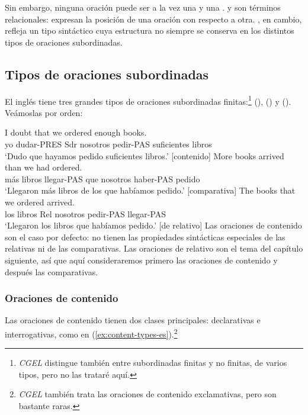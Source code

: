 Sin embargo, ninguna oración puede ser a la vez una  y una .  y  son términos relacionales: expresan la posición de una oración con respecto a otra. , en cambio, refleja un tipo sintáctico cuya estructura no siempre se conserva en los distintos tipos de oraciones subordinadas.

\subsection{Tipos de oraciones subordinadas}

El inglés tiene tres grandes tipos de oraciones subordinadas finitas:\footnote{\textit{CGEL} distingue también entre subordinadas finitas y no finitas, de varios tipos, pero no las trataré aquí.}  (),  () y  (). Veámoslas por orden:

\ea \label{ex:sub-types-es}
    \ea \gll I doubt that we ordered enough books.\\
        yo dudar-PRES Sdr nosotros pedir-PAS suficientes libros\\
    \glt `Dudo que hayamos pedido suficientes libros.' [contenido]
    \ex \gll More books arrived than we had ordered.\\
        más libros llegar-PAS que nosotros haber-PAS pedido\\
    \glt `Llegaron más libros de los que habíamos pedido.' [comparativa]
    \ex \gll The books that we ordered arrived.\\
        los libros Rel nosotros pedir-PAS llegar-PAS\\
    \glt `Llegaron los libros que habíamos pedido.' [de relativo]
    \z
\z
Las oraciones de contenido son el caso por defecto: no tienen las propiedades sintácticas especiales de las relativas ni de las comparativas. Las oraciones de relativo son el tema del capítulo siguiente, así que aquí consideraremos primero las oraciones de contenido y después las comparativas.

\subsubsection{Oraciones de contenido}

Las oraciones de contenido tienen dos clases principales: declarativas e interrogativas, como en (\ref{ex:content-types-es}).\footnote{\textit{CGEL} también trata las oraciones de contenido exclamativas, pero son bastante raras.}

